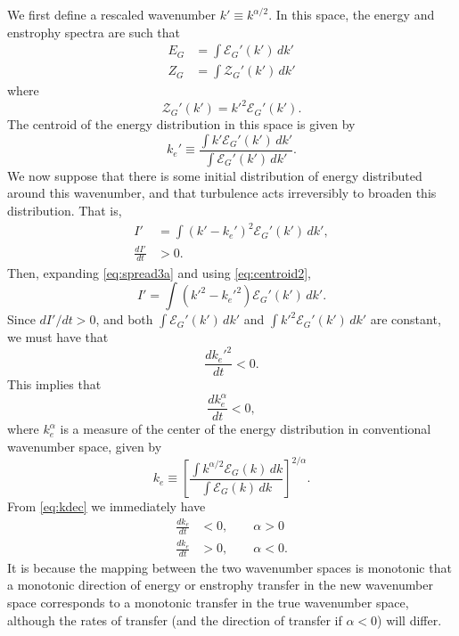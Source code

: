 \documentclass{jfm}
\newcommand{\ca}  [1]{\mathcal{#1}}
\begin{document}
We first define a rescaled wavenumber $k' \equiv k^{\alpha/2}$.
In this space, the energy and enstrophy spectra are such that
\begin{subequations}
\begin{align}
E_G & = \int \ca{E}_G'(k') \,dk' \\
Z_G & =  \int \ca{Z}_G'(k') \,dk'
\end{align}
\end{subequations}
where
\begin{equation}
\ca{Z}_G'(k') = k'^2\ca{E}_G'(k').
\end{equation}
The centroid of the energy distribution in this space is given by
\begin{equation}
\label{eq:centroid2}
k_e' \equiv \frac{\int k' \ca{E}_G'(k')\, dk'}{\int \ca{E}_G'(k') \,dk'}.
\end{equation}
We now suppose that there is some initial distribution of energy
distributed around this wavenumber, and that turbulence
acts irreversibly to broaden this distribution.  That is,
\begin{subequations}
\label{eq:spread3}
\begin{align}
\label{eq:spread3a}
I' & = \int \left( k' - k_e' \right)^2 \ca{E}_G'(k') \, dk' , \\
\frac{d {I'}}{dt} & > 0 .
\end{align}
\end{subequations}
Then, expanding \eqref{eq:spread3a} and  using \eqref{eq:centroid2},
\begin{equation}
  {I'} =  \int (k'^2 - k_e'^2) \ca{E}_G'(k') \, dk' .
\end{equation}
Since $dI'/dt >0$, and both $\int \ca{E}_G'(k') \, dk'$ and  $\int
k'^2 \ca{E}_G'(k') \, dk'$ are constant, we must have that
\begin{equation}
\frac{d k_e'^2}{dt} < 0.
\end{equation}
This implies that
\begin{equation}
\frac{d k^\alpha_e}{dt} < 0,
\label{eq:kdec}
\end{equation}
where $k^\alpha_e$ is a measure of the center of the
energy distribution in conventional wavenumber space, given by
\begin{equation}
k_e \equiv \left[\frac{\int k^{\alpha/2} \ca{E}_G(k)\, dk}
{\int \ca{E}_G(k) \,dk}\right]^{2/\alpha}.
\label{eq:centroid}
\end{equation}
From \eqref{eq:kdec} we immediately have
\begin{equation}
\begin{aligned}
\label{eq:direc}
\frac{d k_e}{dt} & < 0, \qquad \alpha > 0 \\
\frac{d k_e}{dt} & > 0, \qquad \alpha < 0.
\end{aligned}
\end{equation}
It is because the mapping between the two wavenumber spaces is
monotonic that a monotonic direction of energy or enstrophy transfer in
the new wavenumber space corresponds to a monotonic transfer in the
true wavenumber space, although the rates of transfer (and the
direction of transfer if $\alpha < 0$) will differ.
\end{document}
